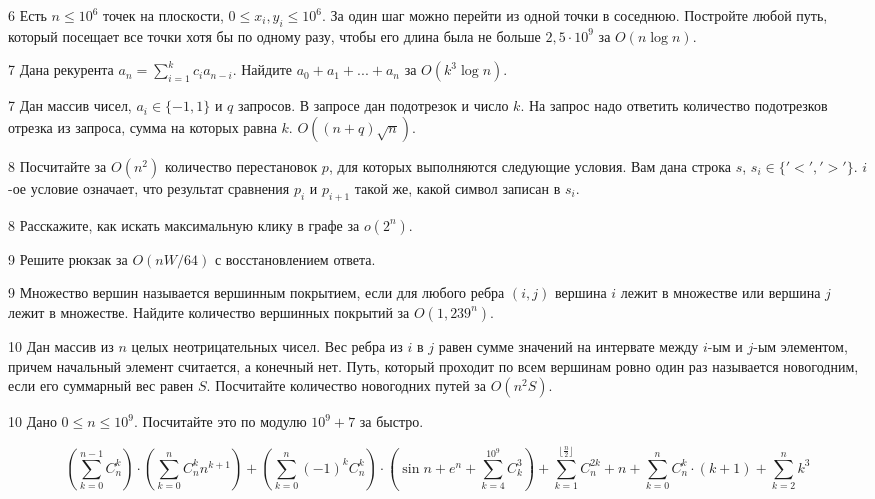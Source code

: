 \documentclass{article}
\begin{document}
\begin{tasks}
		\item[6] Есть $n \leq 10^6$ точек на плоскости, $0 \leq x_i, y_i \leq 10^6$. За один шаг можно перейти из одной точки в соседнюю. Постройте любой путь, который посещает все точки хотя бы по одному разу, чтобы его длина была не больше $2,5 \cdot 10^9$ за $O(n \log n)$.

		\item[7] Дана рекурента $a_n = \sum_{i=1}^{k} c_i a_{n - i}$. Найдите $a_0 + a_1 + ... + a_n$ за $O(k^3 \log n)$.

		\item[7] Дан массив чисел, $a_i \in \{-1, 1 \}$ и $q$ запросов. В запросе дан подотрезок и число $k$. На запрос надо ответить количество подотрезков отрезка из запроса, сумма на которых равна $k$. $O((n + q) \sqrt n)$.

		\item[8] Посчитайте за $O(n^2)$ количество перестановок $p$, для которых выполняются следующие условия. Вам дана строка $s$, $s_i \in \{ '<', '>' \}$. $i$-ое условие означает, что результат сравнения $p_i$ и $p_{i +1}$ такой же, какой символ записан в $s_i$.

		\item[8] Расскажите, как искать максимальную клику в графе за $o(2^n)$.

		\item[9] Решите рюкзак за $O(nW / 64)$ с восстановлением ответа.
		
		\item[9] Множество вершин называется вершинным покрытием, если для любого ребра $(i, j)$ вершина $i$ лежит в множестве или вершина $j$ лежит в множестве. Найдите количество вершинных покрытий за $O(1,239^n)$.
		
		\item[10] Дан массив из $n$ целых неотрицательных чисел. Вес ребра из $i$ в $j$ равен сумме значений на интервате между $i$-ым и $j$-ым элементом, причем начальный элемент считается, а конечный нет. Путь, который проходит по всем вершинам ровно один раз называется новогодним, если его суммарный вес равен $S$. Посчитайте количество новогодних путей за $O(n^2 S)$.
		
		
		\item[10] Дано $0 \leq n \leq 10^9$. Посчитайте это по модулю $10^9 + 7$ за быстро.
		
		\[
		\left( \sum_{k=0}^{n-1} C_n^k \right) \cdot
		\left ( \sum_{k=0}^n C_n^k n^{k+1} \right) +
		\left( \sum_{k=0}^{n} (-1)^k C_n^k \right) \cdot
		\left( \sin n + e^n + \sum_{k=4}^{10^9} C_k^3 \right) +
		\sum_{k=1}^{\lfloor \frac{n}{2} \rfloor} C_n^{2k} + n +
		\sum_{k=0}^n C_n^k \cdot (k + 1) +
		\sum_{k=2}^n k^3
		\]

	\end{tasks}
\end{document}

